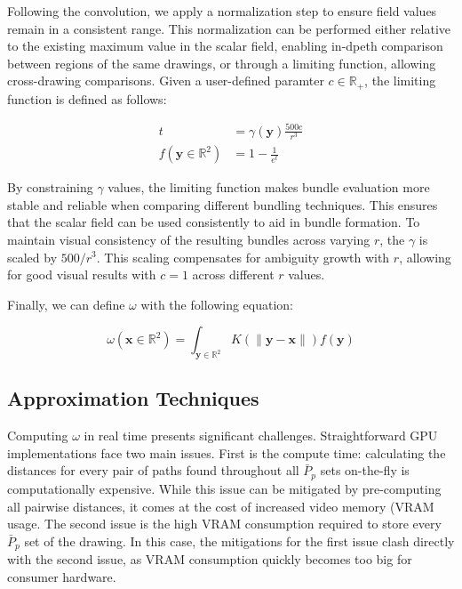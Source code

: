 Following the convolution, we apply a normalization step to ensure field values remain in a consistent range. This normalization can be performed either relative to the existing maximum value in the scalar field, enabling in-dpeth comparison between regions of the same drawings, or through a limiting function, allowing cross-drawing comparisons. Given a user-defined paramter $c \in \mathbb{R}_{+}$, the limiting function is defined as follows:

\begin{align}
t &= {\displaystyle \gamma(\mathbf{y}) \frac{500c}{r^3}}
\\
f(\mathbf{y} \in \mathbb{R}^2) &= 1 - \frac{1}{e^t}
\end{align}

By constraining $\gamma$ values, the limiting function makes bundle evaluation more stable and reliable when comparing different bundling techniques. This ensures that the scalar field can be used consistently to aid in bundle formation. To maintain visual consistency of the resulting bundles across varying $r$, the $\gamma$ is scaled by $500/r^3$. This scaling compensates for ambiguity growth with $r$, allowing for good visual results with $c = 1$ across different $r$ values.

Finally, we can define $\omega$ with the following equation:

\begin{equation}
\omega(\mathbf{x} \in \mathbb{R}^2) = \int_{\mathbf{y} \in \mathbb{R}^2}K(\|\mathbf{y} - \mathbf{x}\|)f(\mathbf{y})
\end{equation}


\subsection{Approximation Techniques}

Computing $\omega$ in real time presents significant challenges. Straightforward GPU implementations face two main issues. First is the compute time: calculating the distances for every pair of paths found throughout all $\bar{P}_p$ sets on-the-fly is computationally expensive. While this issue can be mitigated by pre-computing all pairwise distances, it comes at the cost of increased video memory (VRAM usage. The second issue is the high VRAM consumption required to store every $\bar{P}_p$ set of the drawing. In this case, the mitigations for the first issue clash directly with the second issue, as VRAM consumption quickly becomes too big for consumer hardware.

